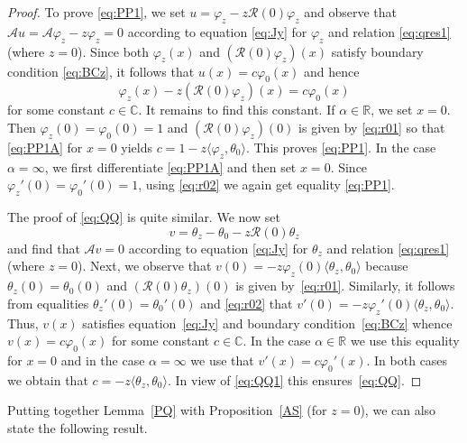 \documentclass[10pt,a4paper]{amsart}
\numberwithin{equation}{section}
\begin{document}
\begin{proof}
 To prove \eqref{eq:PP1}, we set
 $ u= \varphi_{z} -z {\mathcal R}(0) \varphi_{z} $
and observe that $ {\mathcal A } u= {\mathcal A }\varphi_{z}-z \varphi_{z} =0$ according to equation \eqref{eq:Jy} for $ \varphi_{z} $ and relation \eqref{eq:qres1} (where $z=0$). Since both $ \varphi_{z} (x) $ and $( {\mathcal R}(0) \varphi_{z} ) (x) $ satisfy boundary condition \eqref{eq:BCz}, it follows that $u(x)=c \varphi_{0} (x)$ and hence
 \begin{equation}
\varphi_{z}(x) - z ({\mathcal R}(0) \varphi_{z} )(x)= c \varphi_{0} (x)
\label{eq:PP1A}\end{equation}
for some constant $c\in{\mathbb C}$.
It remains to find this constant. If $\alpha\in {\mathbb R}$, we set $x=0$. Then $\varphi_{z} (0)=\varphi_0 (0)=1$ and
$({\mathcal R}(0) \varphi_{z} )(0)$ is given by \eqref{eq:r01} so that \eqref{eq:PP1A} for $x=0$ yields $c= 1-z \langle \varphi_{z}, \theta_{0}\rangle$. This proves \eqref{eq:PP1}. In the case
 $\alpha=\infty$, we first differentiate \eqref{eq:PP1A} and then set $x=0$. Since $\varphi_{z}' (0)=\varphi_0' (0)=1$,
using \eqref{eq:r02} we again get equality \eqref{eq:PP1}.

The proof of \eqref{eq:QQ} is quite similar. We now set
 \begin{equation}
 v=\theta_{z} - \theta_{0} -z {\mathcal R}(0) \theta_{z}
\label{eq:QQ1}\end{equation}
and find that $ {\mathcal A } v= 0$ according to equation \eqref{eq:Jy} for $\theta_{z} $ and relation \eqref{eq:qres1} (where $z=0$). Next, we observe that
 $v (0)= -z \varphi_{z}(0)\langle \theta_{z}, \theta_{0}\rangle$ because $\theta_{z} (0)= \theta_{0} (0)$ and $ ({\mathcal R}(0) \theta_{z})(0)$ is given by~\eqref{eq:r01}. Similarly, it follows from equalities $\theta_{z}' (0)= \theta_{0}' (0)$ and \eqref{eq:r02} that $v' (0)= -z \varphi_{z}'(0)\langle \theta_{z}, \theta_{0}\rangle$. Thus, $v(x)$ satisfies equation~\eqref{eq:Jy}
 and boundary condition~\eqref{eq:BCz} whence $v(x)=c \varphi_{0} (x)$ for some constant $c\in{\mathbb C}$.
 In the case
 $\alpha\in {\mathbb R}$ we use this equality for $x=0$ and in the case
 $\alpha=\infty$ we use that $v'(x)=c \varphi_{0}' (x)$. In both cases we obtain that $c=- z \langle \theta_{z}, \theta_{0} \rangle$. In view of \eqref{eq:QQ1} this ensures~\eqref{eq:QQ}.
\end{proof}

 Putting together Lemma~\ref{PQ} with Proposition~\ref{AS} (for $z=0$), we can also state the following result.
\end{document}
